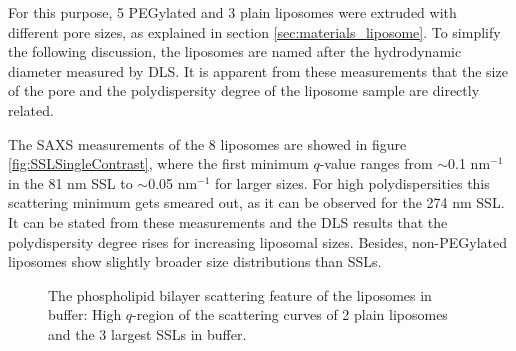 

For this purpose, 5 PEGylated and 3 plain liposomes were extruded with different pore sizes, as explained in section \ref{sec:materials_liposome}. To simplify the following discussion, the liposomes are named after the hydrodynamic diameter measured by DLS. It is apparent from these measurements that the size of the pore and the polydispersity degree of the liposome sample are directly related.

The SAXS measurements of the 8 liposomes are showed in figure \ref{fig:SSLSingleContrast}, where the first minimum  $q$-value ranges from $\sim$0.1 nm$^{-1}$ in the 81 nm SSL to $\sim$0.05 nm$^{-1}$ for larger sizes. For high polydispersities this scattering minimum gets smeared out, as it can be observed for the 274 nm SSL. It can be stated from these measurements and the DLS results that the polydispersity degree rises for increasing liposomal sizes. Besides, non-PEGylated liposomes show slightly broader size distributions than SSLs.

\begin{figure}
	\centering
		
		\caption[The phospholipid bilayer scattering feature of the liposomes in buffer.]{The phospholipid bilayer scattering feature of the liposomes in buffer: High $q$-region of the scattering curves of 2 plain liposomes and the 3 largest SSLs in buffer.}
		\label{fig:SSLSingleContrastBilayer}
\end{figure}



